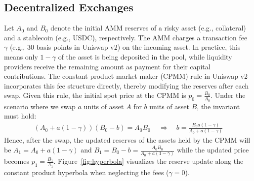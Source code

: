 \documentclass[11pt]{article} %
\begin{document}
\subsection{Decentralized Exchanges}\label{sec:background-dex}
Let $A_0$ and $B_0$ denote the initial AMM reserves of a risky asset (e.g., collateral) and a stablecoin (e.g., USDC), respectively. The AMM charges a transaction fee $\gamma$ (e.g., 30 basis points in Uniswap v2) on the incoming asset. In practice, this means only $1-\gamma$ of the asset is being deposited in the pool, while liquidity providers receive the remaining amount as payment for their capital contributions. The constant product market maker (CPMM) rule in Uniswap v2 incorporates this fee structure directly, thereby modifying the reserves after each swap. Given this rule, the initial spot price at the CPMM is $p_0 = \frac{B_0}{A_0}$.
Under the scenario where we swap $a$ units of asset $A$ for $b$ units of asset $B$, the invariant must hold:
\begin{align*}
(A_0+a (1-\gamma))(B_0-b)=A_0B_0\, \quad \Rightarrow \quad 
b=\frac{B_0a (1-\gamma)}{A_0+a (1-\gamma)}
\end{align*}
Hence, after the swap, the updated reserves of the assets held by the CPMM will be $A_1=A_0+a (1-\gamma)$ and $B_1=B_0-b=\frac{A_0 B_0}{A_0 +a (1-\gamma)}$ while the updated price becomes $p_1=\frac{B_1}{A_1}$. Figure~\ref{fig:hyperbola} visualizes the reserve update along the constant product hyperbola when neglecting the fees ($\gamma = 0$).
\end{document}
